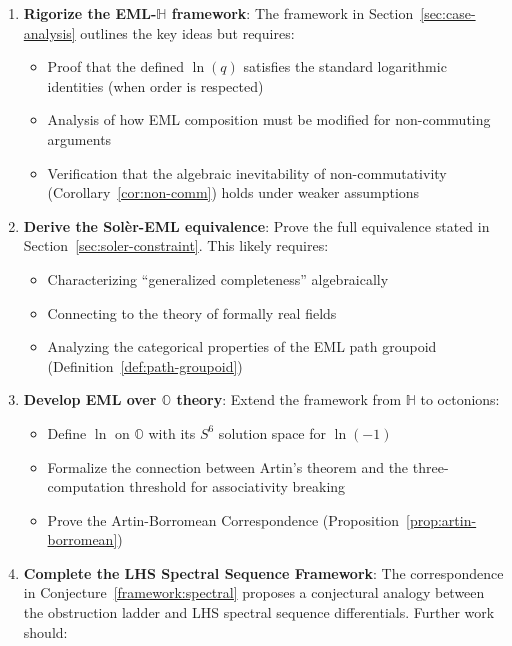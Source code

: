 \documentclass[11pt]{article}
\providecommand{\tightlist}{%
  \setlength{\itemsep}{0pt}\setlength{\parskip}{0pt}}
\begin{document}
\begin{enumerate}
\def\labelenumi{\arabic{enumi}.}
\tightlist
\item
  \textbf{Rigorize the EML-$\mathbb{H}$ framework}: The framework in Section~\ref{sec:case-analysis} outlines the key ideas but requires:

  \begin{itemize}
  \tightlist
  \item
    Proof that the defined \(\ln(q)\) satisfies the standard logarithmic identities (when order is respected)
  \item
    Analysis of how EML composition must be modified for non-commuting arguments
  \item
    Verification that the algebraic inevitability of non-commutativity (Corollary~\ref{cor:non-comm}) holds under weaker assumptions
  \end{itemize}
\item
  \textbf{Derive the Solèr-EML equivalence}: Prove the full equivalence stated in Section~\ref{sec:soler-constraint}. This likely requires:

  \begin{itemize}
  \tightlist
  \item
    Characterizing ``generalized completeness'' algebraically
  \item
    Connecting to the theory of formally real fields
  \item
    Analyzing the categorical properties of the EML path groupoid (Definition~\ref{def:path-groupoid})
  \end{itemize}
\item
  \textbf{Develop EML over $\mathbb{O}$ theory}: Extend the framework from $\mathbb{H}$ to octonions:

  \begin{itemize}
  \tightlist
  \item
    Define \(\ln\) on $\mathbb{O}$ with its \(S^6\) solution space for \(\ln(-1)\)
  \item
    Formalize the connection between Artin's theorem and the three-computation threshold for associativity breaking
  \item
    Prove the Artin-Borromean Correspondence (Proposition~\ref{prop:artin-borromean})
  \end{itemize}
\item
  \textbf{Complete the LHS Spectral Sequence Framework}: The correspondence in Conjecture~\ref{framework:spectral} proposes a conjectural analogy between the obstruction ladder and LHS spectral sequence differentials. Further work should:


\end{enumerate}
\end{document}
